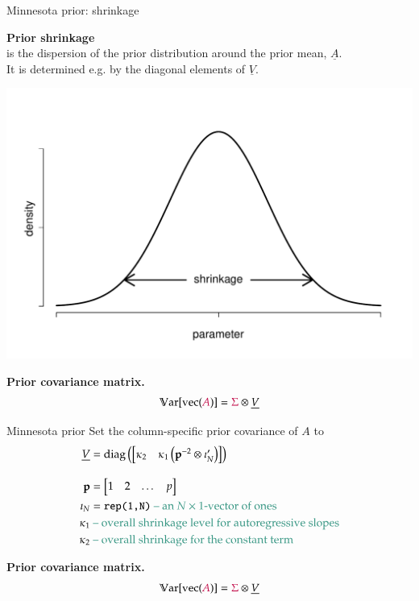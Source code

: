 \documentclass[notes,blackandwhite,mathsans,usenames,dvipsnames]{beamer}
\begin{document}
\begin{frame}{Minnesota prior: shrinkage}

\textbf{Prior shrinkage}\\
{\color{mcxs2}is the dispersion of the prior distribution around the prior mean,} $\underline{A}$.\\  
{\color{mcxs2}It is determined e.g. by the diagonal elements of} $\underline{V}$.

\begin{center}
\includegraphics[scale=0.3]{shrinkage.pdf}
\end{center}

\bigskip\textbf{Prior covariance matrix.}
$$ \mathbb{V}\text{ar}[\text{vec}({\color{purple}A})] = {\color{purple}\Sigma}\otimes\underline{V} $$

\end{frame}


\begin{frame}{Minnesota prior}
\small
{\color{mcxs2}Set the column-specific prior covariance of} $A$ {\color{mcxs2}to}
\begin{align*}
\underline{V}&=\text{diag}\left(\begin{bmatrix}\kappa_2& \kappa_1\left(\mathbf{p}^{-2}\otimes\imath_N'\right)\end{bmatrix}\right)\\[2ex]
\mathbf{p} &= \begin{bmatrix} 1&2&\dots&p \end{bmatrix}\\
\imath_N &=\texttt{rep(1,N)}{\color{mcxs2}\text{ -- an $N\times1$-vector of ones}}\\
\kappa_1 &{\color{mcxs2}\text{ -- overall shrinkage level for autoregressive slopes}}\\
\kappa_2 &{\color{mcxs2}\text{ -- overall shrinkage for the constant term}}
\end{align*}

\bigskip\textbf{Prior covariance matrix.}
$$ \mathbb{V}\text{ar}[\text{vec}({\color{purple}A})] = {\color{purple}\Sigma}\otimes\underline{V} $$
\end{frame}
\end{document}
